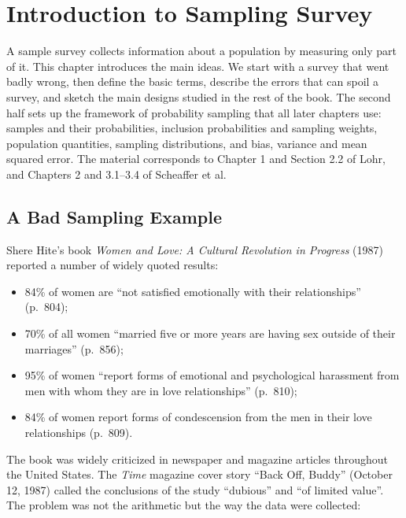 \documentclass[
  letterpaper,
  DIV=11,
  numbers=noendperiod]{scrreprt}
\providecommand{\tightlist}{%
  \setlength{\itemsep}{0pt}\setlength{\parskip}{0pt}}
\renewcommand{\[}{\begin{equation}}
\renewcommand{\]}{\end{equation}}
\begin{document}

\chapter{Introduction to Sampling
Survey}\label{introduction-to-sampling-survey}

A sample survey collects information about a population by measuring
only part of it. This chapter introduces the main ideas. We start with a
survey that went badly wrong, then define the basic terms, describe the
errors that can spoil a survey, and sketch the main designs studied in
the rest of the book. The second half sets up the framework of
probability sampling that all later chapters use: samples and their
probabilities, inclusion probabilities and sampling weights, population
quantities, sampling distributions, and bias, variance and mean squared
error. The material corresponds to Chapter 1 and Section 2.2 of Lohr,
and Chapters 2 and 3.1--3.4 of Scheaffer et al.

\section{A Bad Sampling Example}\label{sec-intro-hite}

Shere Hite's book \emph{Women and Love: A Cultural Revolution in
Progress} (1987) reported a number of widely quoted results:

\begin{itemize}
\tightlist
\item
  84\% of women are ``not satisfied emotionally with their
  relationships'' (p.~804);
\item
  70\% of all women ``married five or more years are having sex outside
  of their marriages'' (p.~856);
\item
  95\% of women ``report forms of emotional and psychological harassment
  from men with whom they are in love relationships'' (p.~810);
\item
  84\% of women report forms of condescension from the men in their love
  relationships (p.~809).
\end{itemize}

The book was widely criticized in newspaper and magazine articles
throughout the United States. The \emph{Time} magazine cover story
``Back Off, Buddy'' (October 12, 1987) called the conclusions of the
study ``dubious'' and ``of limited value''. The problem was not the
arithmetic but the way the data were collected:
\end{document}
